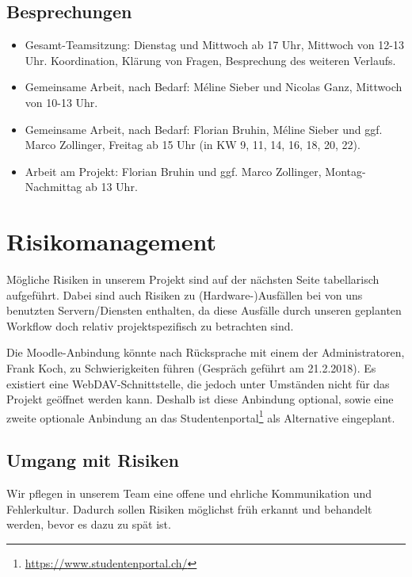\documentclass[a4paper]{article}
\let\oldsection\section
\renewcommand\section{\clearpage\oldsection}
\begin{document}
\subsection{Besprechungen}
\begin{itemize}
\item Gesamt-Teamsitzung: Dienstag und Mittwoch ab 17 Uhr, Mittwoch von 12-13 Uhr. Koordination, Klärung von Fragen, Besprechung des weiteren Verlaufs.
\item Gemeinsame Arbeit, nach Bedarf: Méline Sieber und Nicolas Ganz, Mittwoch von 10-13 Uhr.
\item Gemeinsame Arbeit, nach Bedarf: Florian Bruhin, Méline Sieber und ggf. Marco Zollinger, Freitag ab 15 Uhr (in KW 9, 11, 14, 16, 18, 20, 22).
\item Arbeit am Projekt: Florian Bruhin und ggf. Marco Zollinger, Montag-Nachmittag ab 13 Uhr.
\end{itemize}

\section{Risikomanagement}
Mögliche Risiken in unserem Projekt sind auf der nächsten Seite tabellarisch
aufgeführt. Dabei sind auch Risiken zu (Hardware-)Ausfällen bei von uns
benutzten Servern/Diensten enthalten, da diese Ausfälle durch unseren geplanten
Workflow doch relativ projektspezifisch zu betrachten sind.

Die Moodle-Anbindung könnte nach Rücksprache mit einem der Administratoren,
Frank Koch, zu Schwierigkeiten führen (Gespräch geführt am 21.2.2018). Es
existiert eine WebDAV-Schnittstelle, die jedoch unter Umständen nicht für das
Projekt geöffnet werden kann. Deshalb ist diese Anbindung optional, sowie eine
zweite optionale Anbindung an das
Studentenportal\footnote{\url{https://www.studentenportal.ch/}} als Alternative
eingeplant.

\subsection{Umgang mit Risiken}

Wir pflegen in unserem Team eine offene und ehrliche Kommunikation und
Fehlerkultur. Dadurch sollen Risiken möglichst früh erkannt und behandelt
werden, bevor es dazu zu spät ist.
\end{document}
